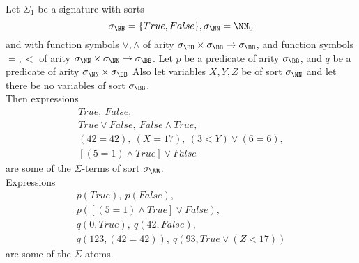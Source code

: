 \begin{example}%
    \label{Sigma1}%
    Let $\Sigma_1$ be a signature with sorts
    \begin{equation*}
        \sigma_\BB = \{True, False\}, \sigma_\NN = \NN_0
    \end{equation*}
    and with function symbols $\vee, \wedge$ of arity $\sigma_\BB\times \sigma_\BB\to \sigma_\BB$,
    and function symbols $=, <$ of arity $\sigma_\NN\times\sigma_\NN\to \sigma_\BB$.
    Let $p$ be a predicate of arity $\sigma_\BB$, and $q$ be a predicate of arity $\sigma_\NN\times\sigma_\BB$
    Also let variables $X, Y, Z$ be of sort $\sigma_\NN$ and let there be no variables of sort $\sigma_\BB$.\\
    Then expressions
    \begin{gather*}
        True,\ False,\\
        True \vee False,\ False \wedge True,\\
        (42 = 42),\ (X = 17),\ (3 < Y) \vee (6 = 6),\\
        [(5 = 1)\wedge True] \vee False
    \end{gather*}
    are some of the $\Sigma$-terms of sort $\sigma_\BB$.\\
    Expressions
    \begin{gather*}
        p(True),\ p(False),\\
        p([(5 = 1) \wedge True] \vee False),\\
        q(0, True),\ q(42, False),\\
        q(123, (42 = 42)),\ q(93, True \vee (Z < 17))
    \end{gather*}
    are some of the $\Sigma$-atoms.
\end{example}

